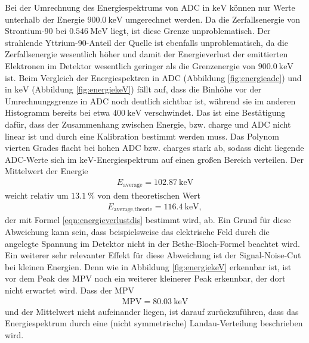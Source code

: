 Bei der Umrechnung des Energiespektrums von ADC in $\si{\kilo\electronvolt}$ können nur Werte unterhalb der Energie $\SI{900.0}{\kilo\electronvolt}$ umgerechnet werden.
Da die Zerfallsenergie von Strontium-90 bei $\SI{0.546}{\mega\electronvolt}$ \cite{anleitung} liegt, ist diese Grenze unproblematisch. Der strahlende Yttrium-90-Anteil der Quelle
ist ebenfalls unproblematisch, da die Zerfallsenergie wesentlich höher und damit der Energieverlust der emittierten Elektronen im Detektor wesentlich geringer als die Grenzenergie von $\SI{900.0}{\kilo\electronvolt}$ ist.
Beim Vergleich der Energiespektren in ADC (Abbildung \ref{fig:energieadc}) und in $\si{\kilo\electronvolt}$ (Abbildung \ref{fig:energiekeV}) fällt auf, dass die Binhöhe vor der Umrechnungsgrenze in ADC noch deutlich sichtbar ist, während
sie im anderen Histogramm bereits bei etwa $\SI{400}{\kilo\electronvolt}$ verschwindet. Das ist eine Bestätigung dafür, dass der Zusammenhang zwischen
Energie, bzw. charge und ADC nicht linear ist und durch eine Kalibration bestimmt werden muss. Das Polynom vierten Grades flacht bei hohen ADC bzw. charges stark ab, sodass
dicht liegende ADC-Werte sich im $\si{\kilo\electronvolt}$-Energiespektrum auf einen großen Bereich verteilen. Der Mittelwert der Energie
\begin{align}
  E_\text{average} = \SI{102.87}{\kilo\electronvolt}
\end{align}
weicht relativ um $\SI{13.1}{\percent}$ von dem theoretischen Wert
\begin{align}
  E_\text{average,theorie} = \SI{116.4}{\kilo\electronvolt},
\end{align}
der mit Formel \eqref{eqn:energieverlustdis} bestimmt wird, ab. Ein Grund für diese Abweichung kann sein, dass beispielsweise das elektrische Feld durch die angelegte Spannung im Detektor nicht in
der Bethe-Bloch-Formel beachtet wird. Ein weiterer sehr relevanter Effekt für diese Abweichung ist der Signal-Noise-Cut bei kleinen Energien. Denn wie in Abbildung \ref{fig:energiekeV} erkennbar ist,
ist vor dem Peak des MPV noch ein weiterer kleinerer Peak erkennbar, der dort nicht erwartet wird. Dass der MPV
\begin{align}
  \text{MPV} = \SI{80.03}{\kilo\electronvolt}
\end{align}
und der Mittelwert nicht aufeinander liegen, ist darauf zurückzuführen, dass das Energiespektrum durch eine (nicht symmetrische) Landau-Verteilung beschrieben wird.

